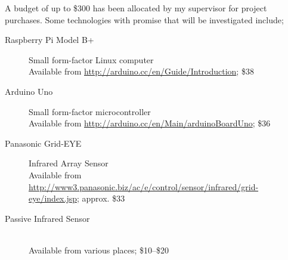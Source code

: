 \documentclass[12pt, a4paper]{article}
\begin{document}
A budget of up to \$300 has been allocated by my supervisor for project purchases. Some technologies with promise that will be investigated include;

\begin{description}
  \item[Raspberry Pi Model B+] Small form-factor Linux computer \hfill \\
  Available from \url{http://arduino.cc/en/Guide/Introduction}; \$38
  
  \item[Arduino Uno] Small form-factor microcontroller \hfill \\
  Available from \url{http://arduino.cc/en/Main/arduinoBoardUno}; \$36
  
  \item[Panasonic Grid-EYE] Infrared Array Sensor \hfill \\
  Available from \url{http://www3.panasonic.biz/ac/e/control/sensor/infrared/grid-eye/index.jsp}; approx. \$33
  
  \item[Passive Infrared Sensor] \hfill \\
  Available from various places; \$10--\$20
  
\end{description}

\newpage



\end{document}
